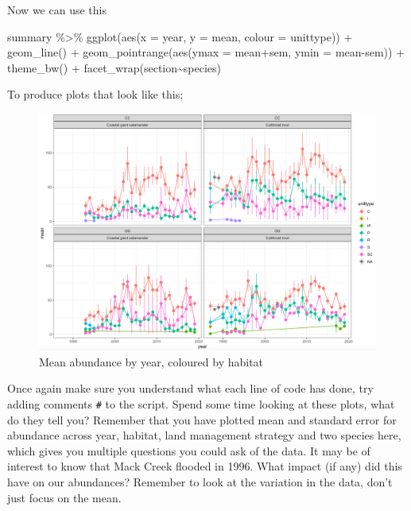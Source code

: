 \documentclass[
]{book}
\newenvironment{Shaded}{\begin{snugshade}}{\end{snugshade}}
\newcommand{\AttributeTok}[1]{\textcolor[rgb]{0.77,0.63,0.00}{#1}}
\newcommand{\FunctionTok}[1]{\textcolor[rgb]{0.00,0.00,0.00}{#1}}
\newcommand{\NormalTok}[1]{#1}
\newcommand{\SpecialCharTok}[1]{\textcolor[rgb]{0.00,0.00,0.00}{#1}}
\begin{document}
Now we can use this

\begin{Shaded}
\begin{Highlighting}[]
\NormalTok{summary }\SpecialCharTok{\%\textgreater{}\%}
  \FunctionTok{ggplot}\NormalTok{(}\FunctionTok{aes}\NormalTok{(}\AttributeTok{x =}\NormalTok{ year, }\AttributeTok{y =}\NormalTok{ mean, }\AttributeTok{colour =}\NormalTok{ unittype)) }\SpecialCharTok{+}
  \FunctionTok{geom\_line}\NormalTok{() }\SpecialCharTok{+}
  \FunctionTok{geom\_pointrange}\NormalTok{(}\FunctionTok{aes}\NormalTok{(}\AttributeTok{ymax =}\NormalTok{ mean}\SpecialCharTok{+}\NormalTok{sem, }\AttributeTok{ymin =}\NormalTok{ mean}\SpecialCharTok{{-}}\NormalTok{sem)) }\SpecialCharTok{+}
  \FunctionTok{theme\_bw}\NormalTok{() }\SpecialCharTok{+}
  \FunctionTok{facet\_wrap}\NormalTok{(section}\SpecialCharTok{\textasciitilde{}}\NormalTok{species)}
\end{Highlighting}
\end{Shaded}

To produce plots that look like this;

\begin{figure}
\includegraphics[width=0.9\linewidth]{figures/Screenshot 2023-03-05 at 12.12.37} \caption{Mean abundance by year, coloured by habitat}\label{fig:unnamed-chunk-18}
\end{figure}

Once again make sure you understand what each line of code has done, try adding comments \texttt{\#} to the script. Spend some time looking at these plots, what do they tell you? Remember that you have plotted mean and standard error for abundance across year, habitat, land management strategy and two species here, which gives you multiple questions you could ask of the data. It may be of interest to know that Mack Creek flooded in 1996. What impact (if any) did this have on our abundances? Remember to look at the variation in the data, don't just focus on the mean.
\end{document}
